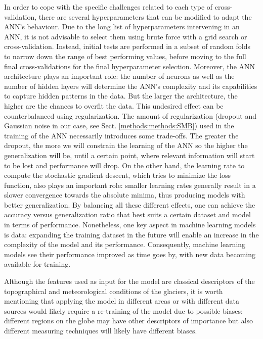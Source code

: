 In order to cope with the specific challenges related to each type of cross-validation, there are several hyperparameters that can be modified to adapt the ANN’s behaviour. Due to the long list of hyperparameters intervening in an ANN, it is not advisable to select them using brute force with a grid search or cross-validation. Instead, initial tests are performed in a subset of random folds to narrow down the range of best performing values, before moving to the full final cross-validations for the final hyperparameter selection. Moreover, the ANN architecture plays an important role: the number of neurons as well as the number of hidden layers will determine the ANN’s complexity and its capabilities to capture hidden patterns in the data. But the larger the architecture, the higher are the chances to overfit the data. This undesired effect can be counterbalanced using regularization. The amount of regularization (dropout and Gaussian noise in our case, see Sect. \ref{methods:methods:SMB}) used in the training of the ANN necessarily introduces some trade-offs. The greater the dropout, the more we will constrain the learning of the ANN so the higher the generalization will be, until a certain point, where relevant information will start to be lost and performance will drop. On the other hand, the learning rate to compute the stochastic gradient descent, which tries to minimize the loss function, also plays an important role: smaller learning rates generally result in a slower convergence towards the absolute minima, thus producing models with better generalization. By balancing all these different effects, one can achieve the accuracy versus generalization ratio that best suits a certain dataset and model in terms of performance. Nonetheless, one key aspect in machine learning models is data: expanding the training dataset in the future will enable an increase in the complexity of the model and its performance. Consequently, machine learning models see their performance improved as time goes by, with new data becoming available for training. 

Although the features used as input for the model are classical descriptors of the topographical and meteorological conditions of the glaciers, it is worth mentioning that applying the model in different areas or with different data sources would likely require a re-training of the model due to possible biases: different regions on the globe may have other descriptors of importance but also different measuring techniques will likely have different biases. 

